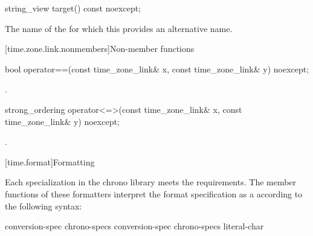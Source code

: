 %
\begin{itemdecl}
string_view target() const noexcept;
\end{itemdecl}

\begin{itemdescr}
\pnum
\returns
The name of the  for which
this  provides an alternative name.
\end{itemdescr}

[time.zone.link.nonmembers]{Non-member functions}

%
\begin{itemdecl}
bool operator==(const time_zone_link& x, const time_zone_link& y) noexcept;
\end{itemdecl}

\begin{itemdescr}
\pnum
\returns
{}.
\end{itemdescr}

%
\begin{itemdecl}
strong_ordering operator<=>(const time_zone_link& x, const time_zone_link& y) noexcept;
\end{itemdecl}

\begin{itemdescr}
\pnum
\returns
{}.
\end{itemdescr}

[time.format]{Formatting}
%

\pnum
Each  specialization
in the chrono library
meets the  requirements.
The  member functions of these formatters
interpret the format specification
as a 
according to the following syntax:

\begin{ncbnf}
\br
        
\end{ncbnf}

\begin{ncbnf}
\br
    conversion-spec\br
    chrono-specs conversion-spec\br
    chrono-specs literal-char
\end{ncbnf}

